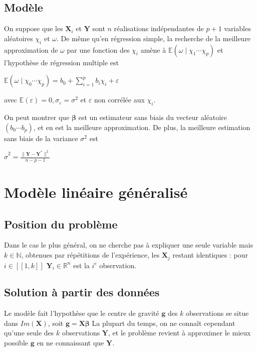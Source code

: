 \documentclass[letterpaper,10pt,english]{jupyterBook}
\begin{document}
\subsection{Modèle}
\label{\detokenize{regression:modele}}
\sphinxAtStartPar
On suppose que les \(\mathbf X_i\) et \(\mathbf Y\) sont \(n\) réalisations indépendantes de \(p+1\) variables aléatoires \(\chi_i\) et \(\omega\). De même qu’en régression simple, la recherche de la meilleure approximation de \(\omega\) par une fonction des \(\chi_i\) amène à \(\mathbb{E}(\omega\mid \chi_1\cdots \chi_p)\) et l’hypothèse de régression multiple est

\sphinxAtStartPar
\(\mathbb{E}(\omega\mid \chi_0\cdots \chi_p) = b_0+\displaystyle\sum_{i=1}^p b_i\chi_i+\varepsilon\)

\sphinxAtStartPar
avec \(\mathbb{E}(\varepsilon)=0, \sigma_\varepsilon=\sigma^2\) et \(\varepsilon\) non corrélée aux \(\chi_i\).

\sphinxAtStartPar
On peut montrer que \(\boldsymbol\beta\) est un estimateur sans biais du vecteur aléatoire  \((b_0\cdots b_p)\), et en est la meilleure approximation. De plus, la meilleure estimation sans biais de la variance \(\sigma^2\) est

\sphinxAtStartPar
\(\hat{\sigma}^2 = \frac{\|\mathbf Y -\mathbf Y^*\|^2}{n-p-1}\)


\section{Modèle linéaire généralisé}
\label{\detokenize{regression:modele-lineaire-generalise}}

\subsection{Position du problème}
\label{\detokenize{regression:position-du-probleme}}
\sphinxAtStartPar
Dans le cas le plus général, on ne cherche pas à expliquer une seule variable mais \(k\in\mathbb{N}\), obtenues par répétitions de l’expérience, les \(\mathbf X_j\) restant identiques : pour \(i\in[\![1,k]\!]\) \(\mathbf{Y}_i\in\mathbb{R}^n\) est la \(i^e\) observation.


\subsection{Solution à partir des données}
\label{\detokenize{regression:solution-a-partir-des-donnees}}
\sphinxAtStartPar
Le modèle fait l’hypothèse que le centre de gravité \(\mathbf g\) des \(k\) observations se situe dans \(Im(\mathbf X)\), soit \(\mathbf g = \mathbf X \boldsymbol \beta\)
La plupart du temps, on ne connaît cependant qu’une seule des \(k\) observations \(\mathbf Y\), et le problème revient à approximer le mieux possible \(\mathbf g\) en ne connaissant que \(\mathbf Y\).
\end{document}
